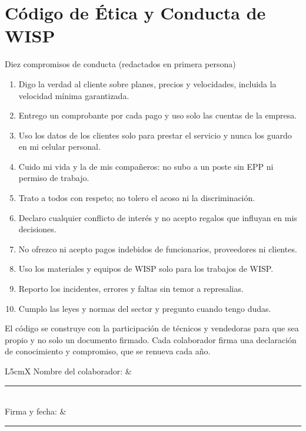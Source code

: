 \section{Código de Ética y Conducta de WISP}

\begin{upeubox}{Diez compromisos de conducta (redactados en primera persona)}
\begin{enumerate}[leftmargin=1.4em]
  \item Digo la verdad al cliente sobre planes, precios y velocidades, incluida la velocidad mínima garantizada.
  \item Entrego un comprobante por cada pago y uso solo las cuentas de la empresa.
  \item Uso los datos de los clientes solo para prestar el servicio y nunca los guardo en mi celular personal.
  \item Cuido mi vida y la de mis compañeros: no subo a un poste sin EPP ni permiso de trabajo.
  \item Trato a todos con respeto; no tolero el acoso ni la discriminación.
  \item Declaro cualquier conflicto de interés y no acepto regalos que influyan en mis decisiones.
  \item No ofrezco ni acepto pagos indebidos de funcionarios, proveedores ni clientes.
  \item Uso los materiales y equipos de WISP solo para los trabajos de WISP.
  \item Reporto los incidentes, errores y faltas sin temor a represalias.
  \item Cumplo las leyes y normas del sector y pregunto cuando tengo dudas.
\end{enumerate}
\end{upeubox}

\noindent El código se construye con la participación de técnicos y vendedoras para que sea
propio y no solo un documento firmado. Cada colaborador firma una declaración de conocimiento
y compromiso, que se renueva cada año.

\medskip
\begin{tabularx}{\linewidth}{L{5cm}X}
Nombre del colaborador: & \rule{7cm}{0.4pt} \\[6pt]
Firma y fecha: & \rule{7cm}{0.4pt} \\
\end{tabularx}
